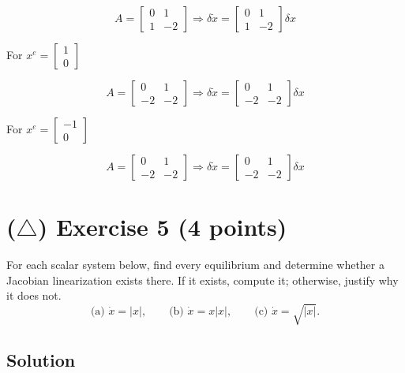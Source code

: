 \documentclass[12pt,a4paper]{article}
\begin{document}
 \[
 A = \begin{bmatrix}
 	0 & 1 \\ 1 & -2
 \end{bmatrix} \Rightarrow \delta\dot x = \begin{bmatrix}
 0 & 1 \\1 & -2
 \end{bmatrix} \delta x
 \]
 
 For $x^e = \begin{bmatrix}
 	1 \\ 0
 \end{bmatrix}
 $
 
 \[
  A = \begin{bmatrix}
 	0 & 1 \\ -2 & -2
 \end{bmatrix} \Rightarrow \delta\dot x = \begin{bmatrix}
 	0 & 1 \\-2 & -2
 \end{bmatrix} \delta x
 \]
 
  For $x^e = \begin{bmatrix}
 	-1 \\ 0
 \end{bmatrix}
 $
 
 \[
 A = \begin{bmatrix}
 	0 & 1 \\ -2 & -2
 \end{bmatrix} \Rightarrow \delta\dot x = \begin{bmatrix}
 	0 & 1 \\-2 & -2
 \end{bmatrix} \delta x
 \]
 
 
 
 
 
 
 
 
 
 
\vspace{3cm}
\clearpage
\section*{($\triangle$) Exercise 5 \hfill {\normalsize (4 points)}}
For each scalar system below, find every equilibrium and determine whether a Jacobian linearization exists there. If it exists, compute it; otherwise, justify why it does not.
\[
\text{(a) }\dot x=|x|,\qquad
\text{(b) }\dot x=x|x|,\qquad
\text{(c) }\dot x=\sqrt{|x|}.
\]
\subsection*{Solution}
\end{document}
